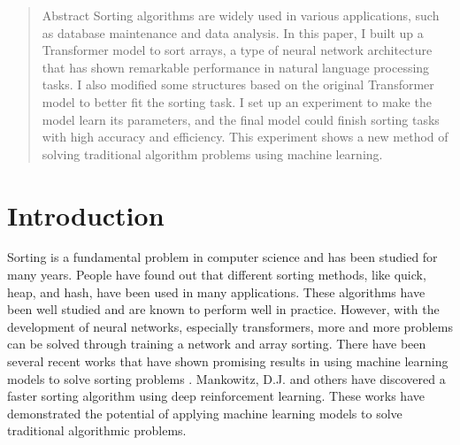 \documentclass{article}
\begin{document}

\vspace{45mm}


\begin{abstract}
    Abstract Sorting algorithms are widely used in various applications, such as database maintenance and data analysis. In this paper, I built up a Transformer model to sort arrays, a type of neural network architecture that has shown remarkable performance in natural language processing tasks. I also modified some structures based on the original Transformer model to better fit the sorting task. I set up an experiment to make the model learn its parameters, and the final model could finish sorting tasks with high accuracy and eﬀiciency.  This experiment shows a new method of solving traditional algorithm problems using machine learning.
\end{abstract}

\section{Introduction}
Sorting is a fundamental problem in computer science and has been studied for many years. People have found out that different sorting methods, like quick, heap, and hash, have been used in many applications. These algorithms have been well studied and are known to perform well in practice. However, with the development of neural networks, especially transformers, more and more problems can be solved through training a network and array sorting. There have been several recent works that have shown promising results in using machine learning models to solve sorting problems \cite{SortNet}. Mankowitz, D.J. and others \cite{FasterSorting} have discovered a faster sorting algorithm using deep reinforcement learning. These works have demonstrated the potential of applying machine learning models to solve traditional algorithmic problems.
\end{document}
